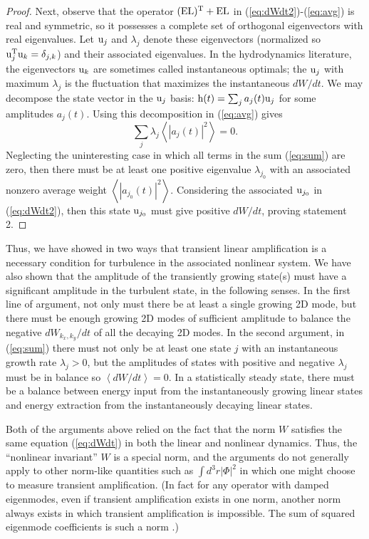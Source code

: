 \documentclass{jpp}
\begin{document}
\begin{proof}
Next, observe that the operator $(\boldsymbol{$E$}\boldsymbol{$L$})^{\mathrm{T}} + \boldsymbol{$E$}\boldsymbol{$L$}$ in (\ref{eq:dWdt2})-(\ref{eq:avg})
is real and symmetric, so it possesses a complete set of orthogonal eigenvectors with real eigenvalues.
Let $\boldsymbol{$u$}_j$ and $\lambda_j$
denote these eigenvectors (normalized so $\boldsymbol{$u$}_j^{\mathrm{T}} \boldsymbol{$u$}_k = \delta_{j,k}$)
and their associated eigenvalues.
In the hydrodynamics literature, the eigenvectors $\boldsymbol{$u$}_k$ are sometimes called
instantaneous optimals; the $\boldsymbol{$u$}_j$ with maximum $\lambda_j$ is the fluctuation
that maximizes the instantaneous $dW/dt$.
We may decompose the state vector in the $\boldsymbol{$u$}_j$ basis:
$\boldsymbol{$h$}(t) = \sum_j a_j(t) \boldsymbol{$u$}_j$ for some amplitudes $a_j(t)$.
Using this decomposition in (\ref{eq:avg}) gives
\begin{equation}
\label{eq:sum}
\sum_j \lambda_j \left< \left| a_j(t) \right|^2 \right>
=0.
\end{equation}
Neglecting the uninteresting case in which all terms in the sum (\ref{eq:sum}) are zero,
then there must be at least one positive eigenvalue $\lambda_{j_0}$ with an associated nonzero
average weight $\left< \left| a_{j_0}(t) \right|^2 \right>$. Considering the associated
$\boldsymbol{$u$}_{j_0}$ in (\ref{eq:dWdt2}), then this state $\boldsymbol{$u$}_{j_0}$ must give positive $dW/dt$,
proving statement 2.
\end{proof}

Thus, we have showed in two ways that transient linear amplification
is a necessary condition for turbulence in the associated nonlinear
system.  We have also shown that the amplitude of the transiently
growing state(s) must have a significant amplitude in the turbulent
state, in the following senses.  In the first line of argument, not
only must there be at least a single growing 2D mode, but there must
be enough growing 2D modes of sufficient amplitude to balance the
negative $dW_{k_x,k_y}/dt$ of all the decaying 2D modes.  In the
second argument, in (\ref{eq:sum}) there must not only be at least one
state $j$ with an instantaneous growth rate $\lambda_j >0$, but the
amplitudes of states with positive and negative $\lambda_j$ must be in
balance so $\left< dW/dt \right>=0$. In a statistically steady state,
there must be a balance between energy input from the instantaneously
growing linear states and energy extraction from the instantaneously
decaying linear states.

Both of the arguments above relied on the fact that the norm $W$ satisfies the same equation
(\ref{eq:dWdt}) in both the linear and nonlinear dynamics.
Thus, the ``nonlinear invariant'' $W$ is a special norm, and the arguments do not generally apply to other norm-like quantities
such as $\int d^3r \left| \Phi \right|^2$ in which one might choose to measure transient amplification.
(In fact for any operator with damped eigenmodes,
even if transient amplification exists in one norm,
another norm always exists in which transient amplification is impossible.
The sum of squared eigenmode coefficients is such a norm \citep{FarrellIoannou1993}.)
\end{document}
